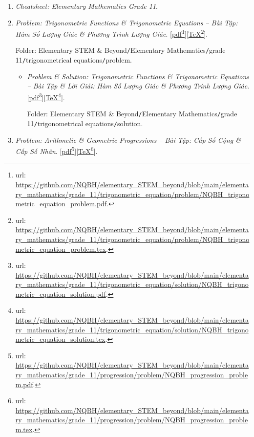 \documentclass[12pt,oneside]{book}
\begin{document}
\begin{enumerate}
	\item {\it Cheatsheet: Elementary Mathematics Grade 11}.
	
	\item {\it Problem: Trigonometric Functions \& Trigonometric Equations -- Bài Tập: Hàm Số Lượng Giác \& Phương Trình Lượng Giác}. [\href{https://github.com/NQBH/elementary_STEM_beyond/blob/main/elementary_mathematics/grade_11/trigonometric_equation/problem/NQBH_trigonometric_equation_problem.pdf}{pdf}\footnote{{\sc url}: \url{https://github.com/NQBH/elementary_STEM_beyond/blob/main/elementary_mathematics/grade_11/trigonometric_equation/problem/NQBH_trigonometric_equation_problem.pdf}.}][\href{https://github.com/NQBH/elementary_STEM_beyond/blob/main/elementary_mathematics/grade_11/trigonometric_equation/problem/NQBH_trigonometric_equation_problem.tex}{\TeX}\footnote{{\sc url}: \url{https://github.com/NQBH/elementary_STEM_beyond/blob/main/elementary_mathematics/grade_11/trigonometric_equation/problem/NQBH_trigonometric_equation_problem.tex}.}].
	
	Folder: {\sf Elementary STEM \& Beyond{\tt/}Elementary Mathematics{\tt/}grade 11{\tt/}trigonometrical equations{\tt/}problem}.
	\begin{itemize}
		\item {\it Problem \& Solution: Trigonometric Functions \& Trigonometric Equations -- Bài Tập \& Lời Giải: Hàm Số Lượng Giác \& Phương Trình Lượng Giác}. [\href{https://github.com/NQBH/elementary_STEM_beyond/blob/main/elementary_mathematics/grade_11/trigonometric_equation/solution/NQBH_trigonometric_equation_solution.pdf}{pdf}\footnote{{\sc url}: \url{https://github.com/NQBH/elementary_STEM_beyond/blob/main/elementary_mathematics/grade_11/trigonometric_equation/solution/NQBH_trigonometric_equation_solution.pdf}.}][\href{https://github.com/NQBH/elementary_STEM_beyond/blob/main/elementary_mathematics/grade_11/trigonometric_equation/solution/NQBH_trigonometric_equation_solution.tex}{\TeX}\footnote{{\sc url}: \url{https://github.com/NQBH/elementary_STEM_beyond/blob/main/elementary_mathematics/grade_11/trigonometric_equation/solution/NQBH_trigonometric_equation_solution.tex}.}].
		
		Folder: {\sf Elementary STEM \& Beyond{\tt/}Elementary Mathematics{\tt/}grade 11{\tt/}trigonometrical equations{\tt/}solution}.
	\end{itemize}
	\item {\it Problem: Arithmetic \& Geometric Progressions -- Bài Tập: Cấp Số Cộng \& Cấp Số Nhân}. [\href{https://github.com/NQBH/elementary_STEM_beyond/blob/main/elementary_mathematics/grade_11/progression/problem/NQBH_progression_problem.pdf}{pdf}\footnote{{\sc url}: \url{https://github.com/NQBH/elementary_STEM_beyond/blob/main/elementary_mathematics/grade_11/progression/problem/NQBH_progression_problem.pdf}.}][\href{https://github.com/NQBH/elementary_STEM_beyond/blob/main/elementary_mathematics/grade_11/progression/problem/NQBH_progression_problem.tex}{\TeX}\footnote{{\sc url}: \url{https://github.com/NQBH/elementary_STEM_beyond/blob/main/elementary_mathematics/grade_11/progression/problem/NQBH_progression_problem.tex}.}].
	

\end{enumerate}
\end{document}
